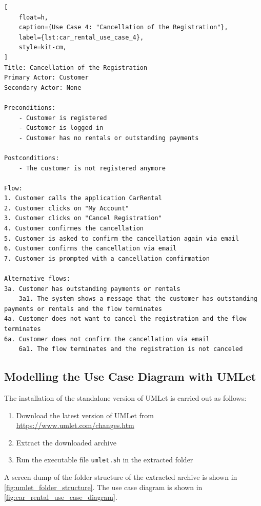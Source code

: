 \begin{lstlisting}[
    float=h,
    caption={Use Case 4: "Cancellation of the Registration"},
    label={lst:car_rental_use_case_4},
    style=kit-cm,
]
Title: Cancellation of the Registration
Primary Actor: Customer
Secondary Actor: None

Preconditions:
    - Customer is registered
    - Customer is logged in
    - Customer has no rentals or outstanding payments

Postconditions:
    - The customer is not registered anymore

Flow:
1. Customer calls the application CarRental
2. Customer clicks on "My Account"
3. Customer clicks on "Cancel Registration"
4. Customer confirmes the cancellation
5. Customer is asked to confirm the cancellation again via email
6. Customer confirms the cancellation via email
7. Customer is prompted with a cancellation confirmation

Alternative flows:
3a. Customer has outstanding payments or rentals
    3a1. The system shows a message that the customer has outstanding payments or rentals and the flow terminates
4a. Customer does not want to cancel the registration and the flow terminates
6a. Customer does not confirm the cancellation via email
    6a1. The flow terminates and the registration is not canceled
\end{lstlisting}

\subsection*{Modelling the Use Case Diagram with UMLet}
The installation of the standalone version of UMLet is carried out as follows:
\begin{enumerate}
    \item Download the latest version of UMLet from \url{https://www.umlet.com/changes.htm}
    \item Extract the downloaded archive
    \item Run the executable file \texttt{umlet.sh} in the extracted folder
\end{enumerate}

A screen dump of the folder structure of the extracted archive is shown in \autoref{fig:umlet_folder_structure}.
The use case diagram is shown in \autoref{fig:car_rental_use_case_diagram}.

